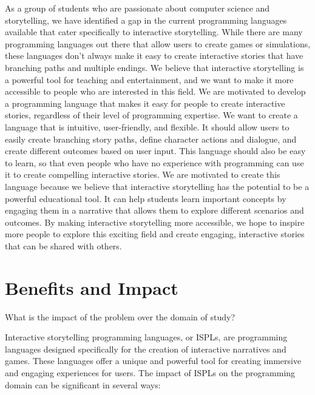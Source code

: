 As a group of students who are passionate about computer science and storytelling, we have identified a gap in the current programming languages available that cater specifically to interactive storytelling. While there are many programming languages out there that allow users to create games or simulations, these languages don't always make it easy to create interactive stories that have branching paths and multiple endings.                                                    
We believe that interactive storytelling is a powerful tool for teaching and entertainment, and we want to make it more accessible to people who are interested in this field. We are motivated to develop a programming language that makes it easy for people to create interactive stories, regardless of their level of programming expertise.
We want to create a language that is intuitive, user-friendly, and flexible. It should allow users to easily create branching story paths, define character actions and dialogue, and create different outcomes based on user input. This language should also be easy to learn, so that even people who have no experience with programming can use it to create compelling interactive stories.
We are motivated to create this language because we believe that interactive storytelling has the potential to be a powerful educational tool. It can help students learn important concepts by engaging them in a narrative that allows them to explore different scenarios and outcomes. By making interactive storytelling more accessible, we hope to inspire more people to explore this exciting field and create engaging, interactive stories that can be shared with others.

\section{Benefits and Impact} 

\noindent What is the impact of the problem over the domain of study?

 Interactive storytelling programming languages, or ISPLs, are programming languages designed specifically for the creation of interactive narratives and games. These languages offer a unique and powerful tool for creating immersive and engaging experiences for users. The impact of ISPLs on the programming domain can be significant in several ways:

